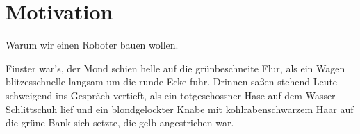 \renewcommand{\autoren}{Aleksandar Stoiljkovic}

\section{Motivation}
Warum wir einen Roboter bauen wollen.
\par\bigskip
Finster war's, der Mond schien helle auf die grünbeschneite Flur, als
ein Wagen blitzesschnelle langsam um die runde Ecke fuhr. Drinnen
saßen stehend Leute schweigend ins Gespräch vertieft, als ein
totgeschossner Hase auf dem Wasser Schlittschuh lief und ein
blondgelockter Knabe mit kohlrabenschwarzem Haar auf die grüne Bank
sich setzte, die gelb angestrichen war.
\newpage
